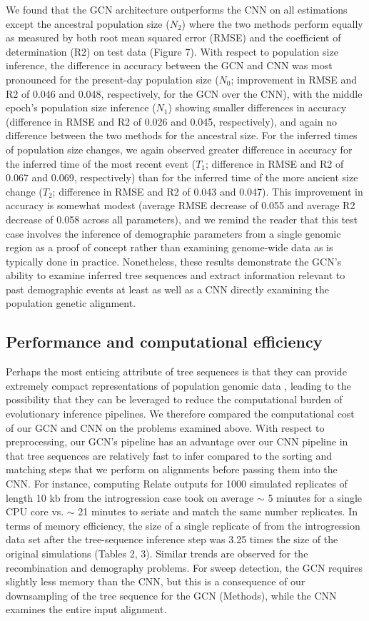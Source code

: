 We found that the GCN architecture outperforms the CNN on all estimations except the ancestral population size ($N_2$) where the two methods perform equally as measured by both root mean squared error (RMSE) and the coefficient of determination (R2) on test data (Figure 7). With respect to population size inference, the difference in accuracy between the GCN and CNN was most pronounced for the present-day population size ($N_0$; improvement in RMSE and R2 of 0.046 and 0.048, respectively, for the GCN over the CNN), with the middle epoch’s population size inference ($N_1$) showing smaller differences in accuracy (difference in RMSE and R2 of 0.026 and 0.045, respectively), and again no difference between the two methods for the ancestral size. For the inferred times of population size changes, we again observed greater difference in accuracy for the inferred time of the most recent event ($T_1$; difference in RMSE and R2 of 0.067 and 0.069, respectively) than for the inferred time of the more ancient size change ($T_2$; difference in RMSE and R2 of 0.043 and 0.047). This improvement in accuracy is somewhat modest (average RMSE decrease of 0.055 and average R2 decrease of 0.058 across all parameters), and we remind the reader that this test case involves the inference of demographic parameters from a single genomic region as a proof of concept rather than examining genome-wide data as is typically done in practice. Nonetheless, these results demonstrate the GCN’s ability to examine inferred tree sequences and extract information relevant to past demographic events at least as well as a CNN directly examining the population genetic alignment. 


\subsection{Performance and computational efficiency}
Perhaps the most enticing attribute of tree sequences is that they can provide extremely compact representations of population genomic data \cite{kelleherInferringWholegenomeHistories2019}, leading to the possibility that they can be leveraged to reduce the computational burden of evolutionary inference pipelines. We therefore compared the computational cost of our GCN and CNN on the problems examined above. With respect to preprocessing, our GCN’s pipeline has an advantage over our CNN pipeline in that tree sequences are relatively fast to infer compared to the sorting and matching steps that we perform on alignments before passing them into the CNN. For instance, computing Relate outputs for 1000 simulated replicates of length 10 kb from the introgression case took on average $\sim$ 5 minutes for a single CPU core vs. $\sim$ 21 minutes to seriate and match the same number replicates. In terms of memory efficiency, the size of a single replicate of from the introgression data set after the tree-sequence inference step was 3.25 times the size of the original simulations (Tables 2, 3). Similar trends are observed for the recombination and demography problems. For sweep detection, the GCN requires slightly less memory than the CNN, but this is a consequence of our downsampling of the tree sequence for the GCN (Methods), while the CNN examines the entire input alignment. 

